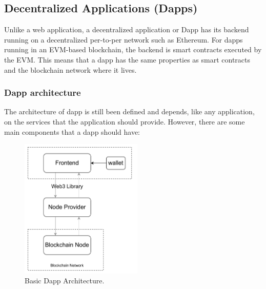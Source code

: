 \documentclass[11pt,a4paper]{report}
\begin{document}
\subsection{Decentralized Applications (Dapps)}\label{sec:dapps}
Unlike a web application, a decentralized application or Dapp\cite{book:dapps}\cite{dapps}\cite{dapps_arch} has its backend running on a decentralized per-to-per network such as Ethereum. For dapps running in an EVM-based blockchain, the backend is smart contracts executed by the EVM. This means that a dapp has the same properties as smart contracts and the blockchain network where it lives.
\subsubsection{Dapp architecture}\label{dapp}
The architecture of dapp is still been defined and depends, like any application, on the services that the application should provide. However, there are some main components that a dapp should have: 
\begin{figure}[htp]
	\centering
	\includegraphics[width=0.52\textwidth]{./images/dapp}
	\caption{Basic Dapp Architecture.}
	\label{fig:dappcomponents}
\end{figure}
\end{document}
